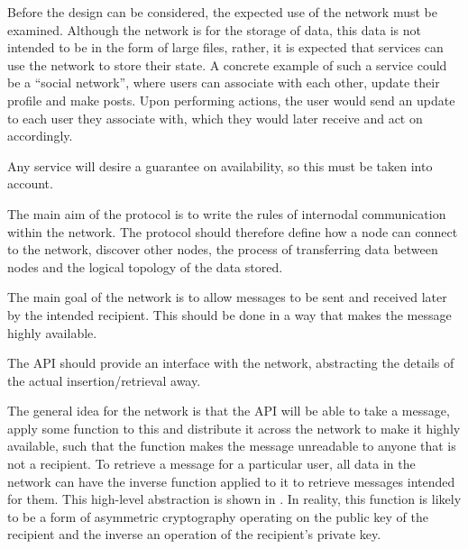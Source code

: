 Before the design can be considered, the expected use of the network must be examined. Although the network is for the storage of data, this data is not intended to be in the form of large files, rather, it is expected that services can use the network to store their state. A concrete example of such a service could be a ``social network'', where users can associate with each other, update their profile and make posts. Upon performing actions, the user would send an update to each user they associate with, which they would later receive and act on accordingly.

Any service will desire a guarantee on availability, so this must be taken into account.

The main aim of the protocol is to write the rules of internodal communication within the network. The protocol should therefore define how a node can connect to the network, discover other nodes, the process of transferring data between nodes and the logical topology of the data stored.

The main goal of the network is to allow messages to be sent and received later by the intended recipient. This should be done in a way that makes the message highly available.

The API should provide an interface with the network, abstracting the details of the actual insertion/retrieval away.

The general idea for the network is that the API will be able to take a message, apply some function to this and distribute it across the network to make it highly available, such that the function makes the message unreadable to anyone that is not a recipient. To retrieve a message for a particular user, all data in the network can have the inverse function applied to it to retrieve messages intended for them. This high-level abstraction is shown in . In reality, this function is likely to be a form of asymmetric cryptography operating on the public key of the recipient and the inverse an operation of the recipient's private key.